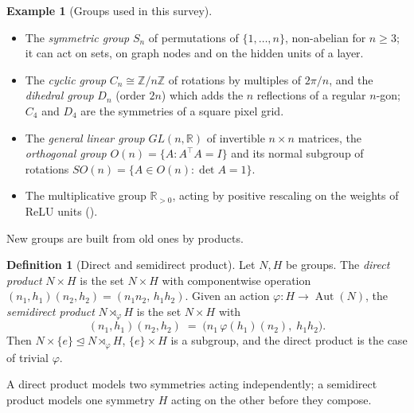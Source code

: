 \documentclass[11pt]{article}
\theoremstyle{plain}
\theoremstyle{definition}
\newtheorem{Definition}{Definition}[section]
\newtheorem{Example}{Example}[section]
\begin{document}
\begin{Example}[Groups used in this survey]\label{ex:groups}
\phantom{u}
\begin{itemize}
    \item The \emph{symmetric group} $S_n$ of permutations of $\{1,\dots,n\}$, non-abelian for $n\geq 3$; it can act on sets, on graph nodes and on the hidden units of a layer.
    \item The \emph{cyclic group} $C_n\cong\mathbb{Z}/n\mathbb{Z}$ of rotations by multiples of $2\pi/n$, and the \emph{dihedral group} $D_n$ (order $2n$) which adds the $n$ reflections of a regular $n$-gon; $C_4$ and $D_4$ are the symmetries of a square pixel grid.
    \item The \emph{general linear group} $GL(n,\mathbb{R})$ of invertible $n\times n$ matrices, the \emph{orthogonal group} $O(n) = \{A : A^\top A = I\}$ and its normal subgroup of rotations $SO(n) = \{A\in O(n) : \det A = 1\}$.
    \item The multiplicative group $\mathbb{R}_{>0}$, acting by positive rescaling on the weights of ReLU units ().
\end{itemize}
\end{Example}

\noindent New groups are built from old ones by products.

\begin{Definition}[Direct and semidirect product]\label{def:semidirect-product}
Let $N,H$ be groups.
The \emph{direct product} $N\times H$ is the set $N\times H$ with componentwise operation $(n_1,h_1)(n_2,h_2) = (n_1n_2,\,h_1h_2)$.
Given an action $\varphi: H\to\operatorname{Aut}(N)$, the \emph{semidirect product} $N\rtimes_\varphi H$ is the set $N\times H$ with
\[
    (n_1,h_1)(n_2,h_2) \;=\; \bigl(n_1\,\varphi(h_1)(n_2),\; h_1h_2\bigr).
\]
Then $N\times\{e\}\trianglelefteq N\rtimes_\varphi H$, $\{e\}\times H$ is a subgroup, and the direct product is the case of trivial $\varphi$.
\end{Definition}

A direct product models two symmetries acting independently; a semidirect product models one symmetry $H$ acting on the other before they compose.
\end{document}
